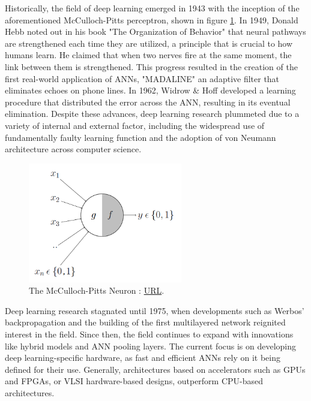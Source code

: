Historically, the field of deep learning emerged in 1943 with the inception of the aforementioned McCulloch-Pitts perceptron, shown in figure \ref{fig:McCulloch-Pitts Neuron}. In 1949, Donald Hebb noted out in his book "The Organization of Behavior" that neural pathways are strengthened each time they are utilized, a principle that is crucial to how humans learn. He claimed that when two nerves fire at the same moment, the link between them is strengthened. This progress resulted in the creation of the first real-world application of ANNs, "MADALINE" an adaptive filter that eliminates echoes on phone lines. In 1962, Widrow \& Hoff developed a learning procedure that distributed the error across the ANN, resulting in its eventual elimination. Despite these advances, deep learning research plummeted due to a variety of internal and external factor, including the widespread use of fundamentally faulty learning function and the adoption of von Neumann architecture across computer science.

\begin{figure}[H]
    \centering
        \includegraphics[width=0.6\textwidth]{Images/ANNArchitectures/McCulloch-Pitts Neuron.png}
        \decoRule
        \caption[McCulloch-Pitts Neuron]{The McCulloch-Pitts Neuron \cite{mc_neuron}: \href{https://towardsdatascience.com/mcculloch-pitts-model-5fdf65ac5dd1}{URL}.}
        \label{fig:McCulloch-Pitts Neuron}
\end{figure}

Deep learning research stagnated until 1975, when developments such as Werbos' backpropagation and the building of the first multilayered network reignited interest in the field. Since then, the field continues to expand with innovations like hybrid models and ANN pooling layers. The current focus is on developing deep learning-specific hardware, as fast and efficient ANNs rely on it being defined for their use. Generally, architectures based on accelerators such as GPUs and FPGAs, or VLSI hardware-based designs, outperform CPU-based architectures. \cite{dl_history}

